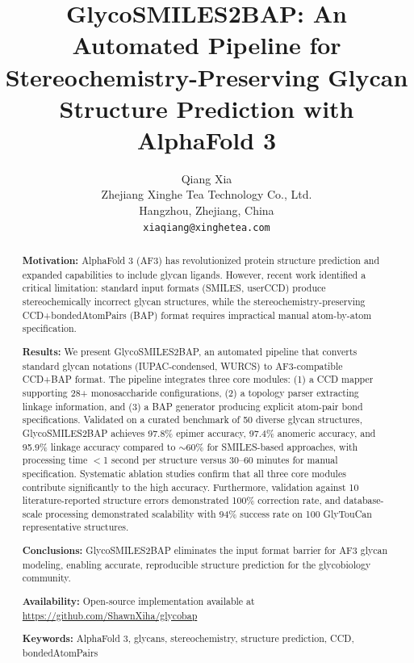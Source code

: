 \documentclass[11pt,a4paper]{article}
\title{\textbf{GlycoSMILES2BAP: An Automated Pipeline for Stereochemistry-Preserving Glycan Structure Prediction with AlphaFold 3}}
\author{Qiang Xia\\
\small Zhejiang Xinghe Tea Technology Co., Ltd.\\
\small Hangzhou, Zhejiang, China\\
\small \texttt{xiaqiang@xinghetea.com}}
\date{}
\begin{document}
\maketitle

\begin{abstract}

\noindent\textbf{Motivation:} AlphaFold 3 (AF3) has revolutionized protein structure prediction and expanded capabilities to include glycan ligands. However, recent work identified a critical limitation: standard input formats (SMILES, userCCD) produce stereochemically incorrect glycan structures, while the stereochemistry-preserving CCD+bondedAtomPairs (BAP) format requires impractical manual atom-by-atom specification.

\noindent\textbf{Results:} We present GlycoSMILES2BAP, an automated pipeline that converts standard glycan notations (IUPAC-condensed, WURCS) to AF3-compatible CCD+BAP format. The pipeline integrates three core modules: (1) a CCD mapper supporting 28+ monosaccharide configurations, (2) a topology parser extracting linkage information, and (3) a BAP generator producing explicit atom-pair bond specifications. Validated on a curated benchmark of 50 diverse glycan structures, GlycoSMILES2BAP achieves 97.8\% epimer accuracy, 97.4\% anomeric accuracy, and 95.9\% linkage accuracy compared to ${\sim}60$\% for SMILES-based approaches, with processing time $<$1 second per structure versus 30--60 minutes for manual specification. Systematic ablation studies confirm that all three core modules contribute significantly to the high accuracy. Furthermore, validation against 10 literature-reported structure errors demonstrated 100\% correction rate, and database-scale processing demonstrated scalability with 94\% success rate on 100 GlyTouCan representative structures.

\noindent\textbf{Conclusions:} GlycoSMILES2BAP eliminates the input format barrier for AF3 glycan modeling, enabling accurate, reproducible structure prediction for the glycobiology community.

\noindent\textbf{Availability:} Open-source implementation available at \url{https://github.com/ShawnXiha/glycobap}

\noindent\textbf{Keywords:} AlphaFold 3, glycans, stereochemistry, structure prediction, CCD, bondedAtomPairs

\end{abstract}
\end{document}
